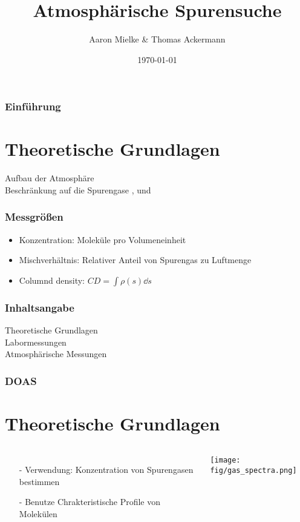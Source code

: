 \documentclass{beamer}
\title{Atmosphärische Spurensuche}
\author{Aaron Mielke \& Thomas Ackermann}
\date{\today}
\begin{document}
\maketitle


\begin{frame}
\frametitle{Einführung}
    \section{Theoretische Grundlagen}
Aufbau der Atmosphäre \\
    Beschränkung auf die Spurengase ,  und  
\end{frame}


\begin{frame}
\frametitle{Messgrößen}
    \begin{itemize}
        \item Konzentration: Moleküle pro Volumeneinheit
        \item Mischverhältnis: Relativer Anteil von Spurengas zu Luftmenge
        \item Columnd density: $CD = \int \rho (s) \dd s$
    \end{itemize}
\end{frame}


\begin{frame}
    \frametitle{Inhaltsangabe}
    Theoretische Grundlagen\\
    \vfill
    Labormessungen\\
    \vfill
    Atmosphärische Messungen 
\end{frame}


\begin{frame}
    \frametitle{DOAS}
    \section{Theoretische Grundlagen}
    \begin{columns}
    \begin{itemize}
        \item[-] Verwendung: Konzentration von Spurengasen bestimmen
        \item[-] Benutze Chrakteristische Profile von Molekülen
    \end{itemize}
    \begin{minipage}{80mm}
        \texttt{[image: fig/gas\_spectra.png]}
    \end{minipage}
    \end{columns}
\end{frame}
\end{document}
